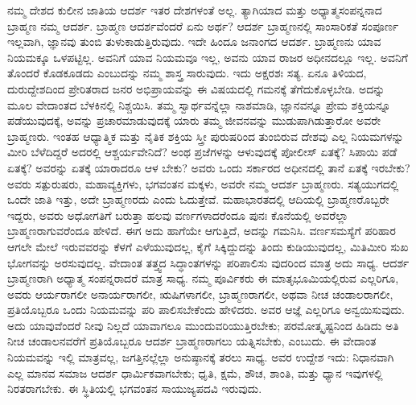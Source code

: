 ನಮ್ಮ ದೇಶದ ಕುಲೀನ ಜಾತಿಯ ಆದರ್ಶ ಇತರ ದೇಶಗಳಂತೆ ಅಲ್ಲ. ತ್ಯಾಗಿ\-ಯಾದ ಮತ್ತು ಅಧ್ಯಾತ್ಮಸಂಪನ್ನನಾದ ಬ್ರಾಹ್ಮಣ ನಮ್ಮ ಆದರ್ಶ. ಬ್ರಾಹ್ಮಣ ಆದರ್ಶವೆಂದರೆ ಏನು ಅರ್ಥ? ಆದರ್ಶ ಬ್ರಾಹ್ಮಣನಲ್ಲಿ ಸಾಂಸಾರಿಕತೆ ಸಂಪೂರ್ಣ ಇಲ್ಲವಾಗಿ, ಜ್ಞಾನವು ತುಂಬಿ ತುಳುಕಾಡುತ್ತಿರುವುದು. ಇದೇ ಹಿಂದೂ ಜನಾಂಗದ ಆದರ್ಶ. ಬ್ರಾಹ್ಮಣನು ಯಾವ ನಿಯಮಕ್ಕೂ ಒಳಪಟ್ಟಿಲ್ಲ. ಅವನಿಗೆ ಯಾವ ನಿಯಮವೂ ಇಲ್ಲ, ಅವನು ಯಾವ ರಾಜರ ಅಧೀನದಲ್ಲೂ ಇಲ್ಲ. ಅವನಿಗೆ ತೊಂದರೆ ಕೊಡಕೂಡದು ಎಂಬುದನ್ನು ನಮ್ಮ ಶಾಸ್ತ್ರ ಸಾರುವುದು. ಇದು ಅಕ್ಷರಶಃ ಸತ್ಯ. ಏನೂ ತಿಳಿಯದ, ದುರುದ್ದೇಶದಿಂದ ಪ್ರೇರಿತರಾದ ಜನರ ಅಭಿಪ್ರಾಯವನ್ನು ಈ ವಿಷಯದಲ್ಲಿ ಗಮನಕ್ಕೆ ತೆಗೆದುಕೊಳ್ಳಬೇಡಿ. ಅದನ್ನು ಮೂಲ ವೇದಾಂತದ ಬೆಳಕಿನಲ್ಲಿ ನಿಶ್ಚಯಿಸಿ. ತಮ್ಮ ಸ್ವಾರ್ಥವನ್ನೆಲ್ಲಾ ನಾಶಮಾಡಿ, ಜ್ಞಾನವನ್ನೂ ಪ್ರೇಮ ಶಕ್ತಿಯನ್ನೂ ಪಡೆಯುವುದಕ್ಕೆ, ಅವನ್ನು ಪ್ರಚಾರಮಾಡುವುದಕ್ಕೆ ಯಾರು ತಮ್ಮ ಜೀವನವನ್ನು ಮುಡುಪಾಗಿಡುತ್ತಾರೋ ಅವರೇ ಬ್ರಾಹ್ಮಣರು. ಇಂತಹ ಆಧ್ಯಾತ್ಮಿಕ ಮತ್ತು ನೈತಿಕ ಶಕ್ತಿಯ ಸ್ತ್ರೀ ಪುರುಷರಿಂದ ತುಂಬಿರುವ ದೇಶವು ಎಲ್ಲ ನಿಯಮಗಳನ್ನು ಮೀರಿ ಬೆಳೆದಿದ್ದರೆ ಅದರಲ್ಲಿ ಆಶ್ಚರ್ಯವೇನಿದೆ? ಅಂಥ ಪ್ರಜೆಗಳನ್ನು ಆಳುವುದಕ್ಕೆ ಪೋಲೀಸ್​ ಏತಕ್ಕೆ? ಸಿಪಾಯಿ ಪಡೆ ಏತಕ್ಕೆ? ಅವರನ್ನು ಏತಕ್ಕೆ ಯಾರಾದರೂ ಆಳ ಬೇಕು? ಅವರು ಒಂದು ಸರ್ಕಾರದ ಅಧೀನದಲ್ಲಿ ತಾನೆ ಏತಕ್ಕೆ ಇರಬೇಕು? ಅವರು ಸತ್ಪುರುಷರು, ಮಹಾವ್ಯಕ್ತಿಗಳು, ಭಗವಂತನ ಮಕ್ಕಳು, ಅವರೇ ನಮ್ಮ ಆದರ್ಶ ಬ್ರಾಹ್ಮಣರು. ಸತ್ಯಯುಗದಲ್ಲಿ ಒಂದೇ ಜಾತಿ ಇತ್ತು, ಅದೇ ಬ್ರಾಹ್ಮಣರದು ಎಂದು ಓದುತ್ತೇವೆ. ಮಹಾಭಾರತದಲ್ಲಿ ಆದಿಯಲ್ಲಿ ಬ್ರಾಹ್ಮಣರೊಬ್ಬರೇ ಇದ್ದರು, ಅವರು ಅಧೋಗತಿಗೆ ಬರುತ್ತಾ ಹಲವು ವರ್ಣಗಳಾದರೆಂದೂ ಪುನಃ ಕೊನೆಯಲ್ಲಿ ಅವರೆಲ್ಲಾ ಬ್ರಾಹ್ಮಣರಾಗುವರೆಂದೂ ಹೇಳಿದೆ. ಈಗ ಅದು ಹಾಗೆಯೇ ಆಗುತ್ತಿದೆ, ಅದನ್ನು ಗಮನಿಸಿ. ವರ್ಣಸಮಸ್ಯೆಗೆ ಪರಿಹಾರ ಆಗಲೇ ಮೇಲೆ ಇರುವವರನ್ನು ಕೆಳಗೆ ಎಳೆಯುವುದಲ್ಲ, ಕೈಗೆ ಸಿಕ್ಕಿದ್ದುದನ್ನು ತಿಂದು ಕುಡಿಯುವುದಲ್ಲ, ಮಿತಿಮೀರಿ ಸುಖ ಭೋಗವನ್ನು ಅರಸುವುದಲ್ಲ. ವೇದಾಂತ ತತ್ತ್ವದ ಸಿದ್ಧಾಂತಗಳನ್ನು ಪರಿಪಾಲಿಸು ವುದರಿಂದ ಮಾತ್ರ ಅದು ಸಾಧ್ಯ. ಆದರ್ಶ ಬ್ರಾಹ್ಮಣರಾಗಿ ಅಧ್ಯಾತ್ಮ ಸಂಪನ್ನರಾದರೆ ಮಾತ್ರ ಸಾಧ್ಯ. ನಮ್ಮ ಪೂರ್ವಿಕರು ಈ ಮಾತೃಭೂಮಿಯಲ್ಲಿರುವ ಎಲ್ಲರಿಗೂ, ಅವರು ಆರ್ಯರಾಗಲೀ ಅನಾರ್ಯರಾಗಲೀ, ಋಷಿಗಳಾಗಲೀ, ಬ್ರಾಹ್ಮಣರಾಗಲೀ, ಅಥವಾ ನೀಚ ಚಂಡಾಲರಾಗಲೀ, ಪ್ರತಿಯೊಬ್ಬರೂ ಒಂದು ನಿಯಮವನ್ನು ಪರಿ ಪಾಲಿಸಬೇಕೆಂದು ಹೇಳಿದರು. ಅವರ ಆಜ್ಞೆ ಎಲ್ಲರಿಗೂ ಅನ್ವಯಿಸುವುದು. ಅದು ಯಾವುವೆಂದರೆ ನೀವು ನಿಲ್ಲದೆ ಯಾವಾಗಲೂ ಮುಂದುವರಿಯುತ್ತಿರಬೇಕು; ಪರಮೋತ್ಕೃಷ್ಟನಿಂದ ಹಿಡಿದು ಅತಿ ನೀಚ ಚಂಡಾಲನವರೆಗೆ ಪ್ರತಿಯೊಬ್ಬರೂ ಆದರ್ಶ ಬ್ರಾಹ್ಮಣರಾಗಲು ಯತ್ನಿಸಬೇಕು, ಎಂಬುದು. ಈ ವೇದಾಂತ ನಿಯಮವನ್ನು ಇಲ್ಲಿ ಮಾತ್ರವಲ್ಲ, ಜಗತ್ತಿನಲ್ಲೆಲ್ಲಾ ಅನುಷ್ಠಾನಕ್ಕೆ ತರಲು ಸಾಧ್ಯ. ಅವರ ಉದ್ದೇಶ ಇದು: ನಿಧಾನವಾಗಿ ಎಲ್ಲ ಮಾನವ ಸಮಾಜ ಆದರ್ಶ ಧಾರ್ಮಿಕವಾಗಬೇಕು; ಧೃತಿ, ಕ್ಷಮೆ, ಶೌಚ, ಶಾಂತಿ, ಮತ್ತು ಧ್ಯಾನ ಇವುಗಳಲ್ಲಿ ನಿರತರಾಗಬೇಕು. ಈ ಸ್ಥಿತಿಯಲ್ಲಿ ಭಗವಂತನ ಸಾಯುಜ್ಯಪದವಿ ಇರುವುದು. 

